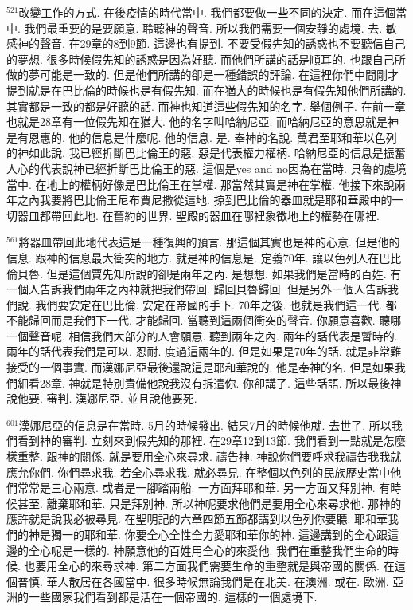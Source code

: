 \documentclass{book}
\begin{document}
$^{521}$改變工作的方式.
在後疫情的時代當中.
我們都要做一些不同的決定.
而在這個當中.
我們最重要的是要願意.
聆聽神的聲音.
所以我們需要一個安靜的處境.
去.
敏感神的聲音.
在29章的8到9節.
這邊也有提到.
不要受假先知的誘惑也不要聽信自己的夢想.
很多時候假先知的誘惑是因為好聽.
而他們所講的話是順耳的.
也跟自己所做的夢可能是一致的.
但是他們所講的卻是一種錯誤的評論.
在這裡你們中間剛才提到就是在巴比倫的時候也是有假先知.
而在猶大的時候也是有假先知他們所講的.
其實都是一致的都是好聽的話.
而神也知道這些假先知的名字.
舉個例子.
在前一章也就是28章有一位假先知在猶大.
他的名字叫哈納尼亞.
而哈納尼亞的意思就是神是有恩惠的.
他的信息是什麼呢.
他的信息.
是.
奉神的名說.
萬君至耶和華以色列的神如此說.
我已經折斷巴比倫王的惡.
惡是代表權力權柄.
哈納尼亞的信息是振奮人心的代表說神已經折斷巴比倫王的惡.
這個是yes and no因為在當時.
貝魯的處境當中.
在地上的權柄好像是巴比倫王在掌權.
那當然其實是神在掌權.
他接下來說兩年之內我要將巴比倫王尼布賈尼撒從這地.
掠到巴比倫的器皿就是耶和華殿中的一切器皿都帶回此地.
在舊約的世界.
聖殿的器皿在哪裡象徵地上的權勢在哪裡.

$^{561}$將器皿帶回此地代表這是一種復興的預言.
那這個其實也是神的心意.
但是他的信息.
跟神的信息最大衝突的地方.
就是神的信息是.
定義70年.
讓以色列人在巴比倫貝魯.
但是這個賈先知所說的卻是兩年之內.
是想想.
如果我們是當時的百姓.
有一個人告訴我們兩年之內神就把我們帶回.
歸回貝魯歸回.
但是另外一個人告訴我們說.
我們要安定在巴比倫.
安定在帝國的手下.
70年之後.
也就是我們這一代.
都不能歸回而是我們下一代.
才能歸回.
當聽到這兩個衝突的聲音.
你願意喜歡.
聽哪一個聲音呢.
相信我們大部分的人會願意.
聽到兩年之內.
兩年的話代表是暫時的.
兩年的話代表我們是可以.
忍耐.
度過這兩年的.
但是如果是70年的話.
就是非常難接受的一個事實.
而漢娜尼亞最後還說這是耶和華說的.
他是奉神的名.
但是如果我們細看28章.
神就是特別責備他說我沒有拆遣你.
你卻講了.
這些話語.
所以最後神說他要.
審判.
漢娜尼亞.
並且說他要死.

$^{601}$漢娜尼亞的信息是在當時.
5月的時候發出.
結果7月的時候他就.
去世了.
所以我們看到神的審判.
立刻來到假先知的那裡.
在29章12到13節.
我們看到一點就是怎麼樣重整.
跟神的關係.
就是要用全心來尋求.
禱告神.
神說你們要呼求我禱告我我就應允你們.
你們尋求我.
若全心尋求我.
就必尋見.
在整個以色列的民族歷史當中他們常常是三心兩意.
或者是一腳踏兩船.
一方面拜耶和華.
另一方面又拜別神.
有時候甚至.
離棄耶和華.
只是拜別神.
所以神呢要求他們是要用全心來尋求他.
那神的應許就是說我必被尋見.
在聖明記的六章四節五節都講到以色列你要聽.
耶和華我們的神是獨一的耶和華.
你要全心全性全力愛耶和華你的神.
這邊講到的全心跟這邊的全心呢是一樣的.
神願意他的百姓用全心的來愛他.
我們在重整我們生命的時候.
也要用全心的來尋求神.
第二方面我們需要生命的重整就是與帝國的關係.
在這個普慎.
華人散居在各國當中.
很多時候無論我們是在北美.
在澳洲.
或在.
歐洲.
亞洲的一些國家我們看到都是活在一個帝國的.
這樣的一個處境下.
\end{document}
